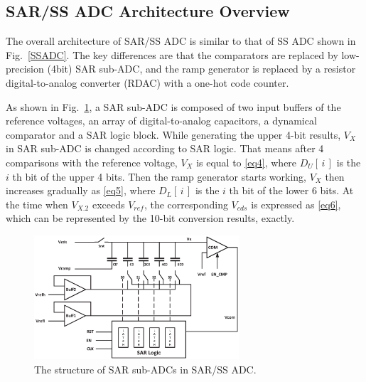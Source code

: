 \subsection{SAR/SS ADC Architecture Overview}\label{over2}

The overall architecture of SAR/SS ADC is similar to that of SS ADC shown in Fig.~\ref{SSADC}. The key differences are that the comparators are replaced by low-precision (4bit) SAR sub-ADC, and
the ramp generator is replaced by a resistor digital-to-analog converter (RDAC) with a one-hot code counter.

As shown in Fig.~\ref{SAR}, a SAR sub-ADC is composed of two input buffers of the reference voltages, an array of digital-to-analog capacitors, a dynamical comparator and a SAR logic block. While generating the upper 4-bit results, $V_{X}$ in SAR sub-ADC is changed according to SAR logic. That means after 4 comparisons 
with the reference voltage, $V_{X}$ is equal to \eqref{eq4}, where $D_{U}\left[\,i\,\right]$ is the $i$ th bit of the upper 4 bits. 
Then the ramp generator starts working, $V_{X}$ then increases gradually as \eqref{eq5}, where $D_{L}\left[\,i\,\right]$ is the $i$ th bit of the lower 6 bits. 
At the time when $V_{X.2}$ exceeds $V_{ref}$, the corresponding $V_{cds}$ is expressed as \eqref{eq6}, which can be represented by the 10-bit conversion results, exactly.

\begin{figure}[htbp]
	\centerline{\includegraphics[width=3in]{./Figures/SAR.eps}}
	\caption{The structure of SAR sub-ADCs in SAR/SS ADC.}
	\label{SAR}
\end{figure}

